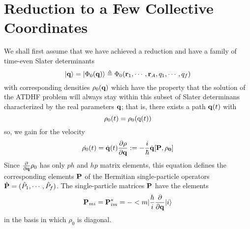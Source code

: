   \section{Reduction to a Few Collective Coordinates}
  We shall first assume that we have achieved a reduction and have a family of time-even Slater determinants
  \begin{equation}
     | \bm{ {\rm q} } \rangle = | \Phi_0(\bm{{\rm q}}) \rangle \triangleq \Phi_0(\bm{{\rm r}}_1,\cdots , \bm{{\rm r}}_A, q_1, \cdots,q_f) 
  \end{equation}
  with corresponding densities $\rho_0(\bm{{\rm q}})$ which have the property that the solution of the ATDHF problem will always stay within this subset of Slater determinans characterized by the real parameters $\bm{{\rm q}}$; that is, there exists a path $\bm{{\rm q}}(t)$ with 
  \begin{equation}
    \rho_0(t) = \rho_0({\rm q}(t))  \label{tdhf114}
  \end{equation}
  so, we gain for the velocity
  \begin{equation}
    \dot{\rho_0}(t) =	\dot{\bf{q}}(t)\frac{\partial\rho}{\partial\bf{q}} := -\frac{i}{\hbar}\dot{\bf{q}}[\bf{P}, \rho_0]  \label{tdhf115}
  \end{equation}
  Since $\frac{\partial}{\partial\bf{q}}\rho_0$ has only $ph$ and $hp$ matrix elements, this equation defines the corresponding elements $\bf{P}$ of the Hermitian single-particle operators $\hat{\bf{P}} = (\hat{P}_1,\cdots,\hat{P}_f)$. The single-particle matrices $\bf{P}$ have the elements
  \begin{equation}
    {\bf{P}}_{mi} = {\bf{P}}^*_{im} = -< m | \frac{\hbar}{i}\frac{\partial}{\partial\bf{q}} | i \rangle 	 \label{tdhf116}
  \end{equation}
  in the basis in which $\rho_0$ is diagonal.


